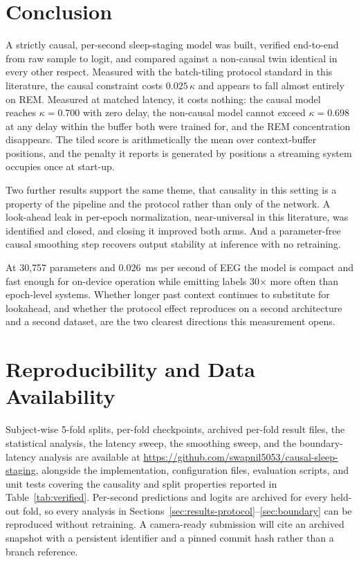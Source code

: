 \documentclass[conference]{IEEEtran}
\begin{document}
\section{Conclusion}

A strictly causal, per-second sleep-staging model was built, verified end-to-end from raw sample to logit, and
compared against a non-causal twin identical in every other respect. Measured with the batch-tiling protocol
standard in this literature, the causal constraint costs $0.025\,\kappa$ and appears to fall almost entirely on
REM. Measured at matched latency, it costs nothing: the causal model reaches $\kappa = 0.700$ with zero delay,
the non-causal model cannot exceed $\kappa = 0.698$ at any delay within the buffer both were trained
for, and the REM concentration disappears. The
tiled score is arithmetically the mean over context-buffer positions, and the penalty it reports is generated
by positions a streaming system occupies once at start-up.

Two further results support the same theme, that causality in this setting is a property of the pipeline and
the protocol rather than only of the network. A look-ahead leak in per-epoch normalization, near-universal in
this literature, was identified and closed, and closing it improved both arms. And a parameter-free causal
smoothing step recovers output stability at inference with no retraining.

At 30{,}757 parameters and $0.026$~ms per second of EEG the model is compact and fast enough for on-device
operation while emitting labels 30$\times$ more often than epoch-level systems. Whether longer past context
continues to substitute for lookahead, and whether the protocol effect reproduces on a second architecture and
a second dataset, are the two clearest directions this measurement opens.

\section*{Reproducibility and Data Availability}
\sloppy

Subject-wise 5-fold splits, per-fold checkpoints, archived per-fold result files, the statistical analysis, the
latency sweep, the smoothing sweep, and the boundary-latency analysis are available at
\url{https://github.com/swapnil5053/causal-sleep-staging}, alongside the implementation, configuration files,
evaluation scripts, and unit tests covering the causality and split properties reported in
Table~\ref{tab:verified}. Per-second predictions and logits are archived for every held-out fold, so every
analysis in Sections~\ref{sec:results-protocol}--\ref{sec:boundary} can be reproduced without retraining. A
camera-ready submission will cite an archived snapshot with a persistent identifier and a pinned commit hash
rather than a branch reference.
\end{document}
